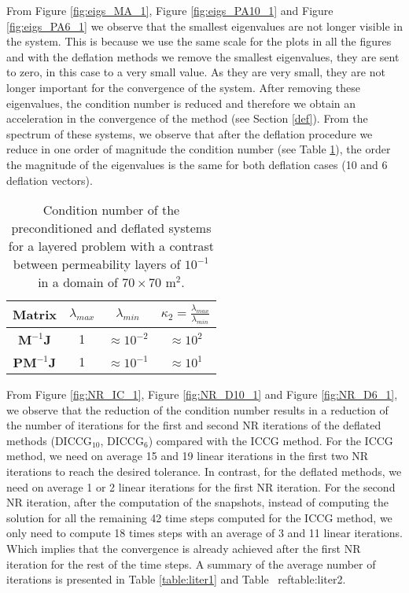 \documentclass[12pt]{article}
\numberwithin{equation}{section}
\begin{document}
From Figure \ref{fig:eigs_MA_1}, Figure \ref{fig:eigs_PA10_1} and Figure \ref{fig:eigs_PA6_1} we observe that the smallest eigenvalues are not longer visible in the system. This is because we use the same scale for the plots in all the figures and with the deflation methods we remove the smallest eigenvalues, they are sent to zero, in this case to a very small value. As they are very small, they are not longer important for the convergence of the system. After removing these eigenvalues, the condition number is reduced and therefore we obtain an acceleration in the convergence of the method (see Section \ref{def}). From the spectrum of these systems, we observe that after the deflation procedure we reduce in one order of magnitude the condition number (see Table \ref{table:cn_1}), the order the magnitude of the eigenvalues is the same for both deflation cases (10 and 6 deflation vectors).\\

\begin{table}[!ht]\centering
\begin{minipage}{.7\textwidth}
\vspace{-10pt}
\centering
\begin{tabular}{ |c|c|c|c|} 
  \hline
 Matrix &$\lambda_{max}$ &$\lambda_{min}$ &$\kappa_2=\frac{\lambda_{max}}{\lambda_{min}}$  \\
  \hline
$\mathbf{M}^{-1}\mathbf{J}$ &1 & $\approx 10^{-2}$&$\approx 10^2$\\
$\mathbf{P}\mathbf{M}^{-1}\mathbf{J}$ &1 & $\approx 10^{-1}$&$\approx 10^1$\\
 \hline
 \end{tabular}
\caption{Condition number of the preconditioned and deflated systems for a layered problem with a contrast between permeability layers of $10^{-1}$ in a domain of $70 \times 70$ m$^2$.}\label{table:cn_1}
\end{minipage}
\end{table}

From Figure \ref{fig:NR_IC_1},  Figure \ref{fig:NR_D10_1} and Figure \ref{fig:NR_D6_1}, we observe that the reduction of the condition number results in a reduction of the number of iterations for the first and second NR iterations of the deflated methods (DICCG$_{10}$, DICCG$_6$) compared with the ICCG method. For the ICCG method, we need on average 15 and 19 linear iterations in the first two NR iterations to reach the desired tolerance. In contrast, for the deflated methods, we need on average 1 or 2 linear iterations for the first NR iteration. For the second NR iteration, after the computation of the snapshots, instead of computing the solution for all the remaining 42 time steps computed for the ICCG method, we only need to compute 18 times steps with an average of 3 and 11 linear iterations. Which implies that the convergence is already achieved after the first NR iteration for the rest of the time steps. A summary of the average number of iterations is presented in Table \ref{table:liter1} and Table \
ref{table:liter2}.\\
\end{document}
